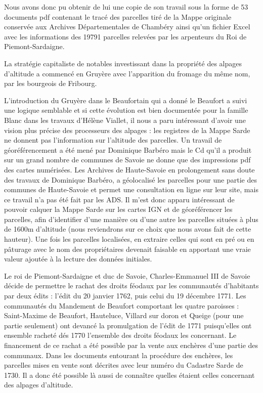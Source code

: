 \documentclass[12pt,a4paper]{report}
\begin{document}
Nous avons donc pu obtenir de lui une copie de son travail sous la forme de 53 documents pdf contenant le tracé des parcelles tiré de la Mappe originale conservée aux Archives Départementales de Chambéry ainsi qu'un fichier Excel avec les informations des 19791 parcelles relevées par les arpenteurs du Roi de Piemont-Sardaigne.


La stratégie capitaliste de notables investissant dans la propriété des alpages d'altitude a commencé  en Gruyère avec l'apparition du fromage du même nom, par les bourgeois de Fribourg.

L'introduction du Gruyère dans le Beaufortain qui a donné le Beaufort a suivi une logique semblable et si cette évolution est bien documentée pour la famille Blanc dans les travaux d'Hélène Viallet, il nous a paru intéressant d'avoir une vision plus précise des processeurs des alpages : les registres de la Mappe Sarde ne donnent pas l'information sur l'altitude des parcelles. Un travail de géoréférencement a été mené par Dominique Barbéro mais le Cd qu'il a produit sur un grand nombre de communes de Savoie ne donne que des impressions pdf des cartes numérisées. Les Archives de Haute-Savoie en prolongement sans doute des travaux de Dominique Barbéro, a géolocalisé les parcelles pour une partie des communes de Haute-Savoie et permet une consultation en ligne sur leur site, mais ce travail n'a pas été fait par les ADS.
Il m'est donc apparu intéressant de pouvoir calquer la Mappe Sarde sur les cartes IGN et de géoréférencer les parcelles, afin d'identifier d'une manière ou d'une autre les parcelles situées à plus de 1600m d'altitude (nous reviendrons sur ce choix que nous avons fait de cette hauteur). Une fois les parcelles localisées, en extraire celles qui sont en pré ou en pâturage avec le nom des propriétaires devenait faisable en apportant une vraie valeur ajoutée à la lecture des données initiales.

Le roi de Piemont-Sardaigne et duc de Savoie, Charles-Emmanuel III de Savoie décide de permettre le rachat des droits féodaux par les communautés d’habitants par deux édits : l’édit du 20 janvier 1762, puis celui du 19 décembre 1771. Les communautés du Mandement de Beaufort comportant les quatre paroisses : Saint-Maxime de Beaufort, Hauteluce, Villard sur doron et Queige (pour une partie seulement) ont devancé la promulgation de l'édit de 1771 puisqu'elles ont ensemble racheté dés 1770 l'ensemble des droits féodaux les concernant. Le financement de ce rachat a été possible par la vente aux enchères d'une partie des communaux. Dans les documents entourant la procédure des enchères, les parcelles mises en vente sont décrites avec leur numéro du Cadastre Sarde de 1730. Il a donc été possible là aussi de connaître quelles étaient celles concernant des alpages d'altitude.  
\end{document}

